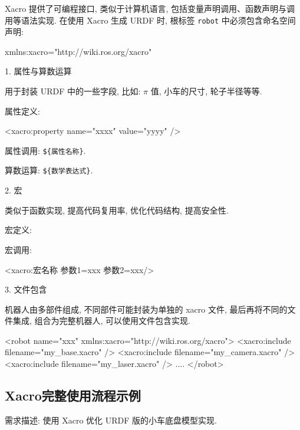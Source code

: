 \documentclass[openany, fontset=windowsold]{ctexbook}
\theoremstyle{kaiti}
\theoremstyle{normal}
\begin{document}
Xacro 提供了可编程接口, 类似于计算机语言, 包括变量声明调用、函数声明与调用等语法实现. 在使用 Xacro 生成 URDF 时, 根标签 \verb|robot| 中必须包含命名空间声明:

\begin{xml}
  xmlns:xacro="http://wiki.ros.org/xacro"
\end{xml}

1. 属性与算数运算

用于封装 URDF 中的一些字段, 比如: $\pi$ 值, 小车的尺寸, 轮子半径等等.

属性定义:

\begin{xml}
  <xacro:property name="xxxx" value="yyyy" />
\end{xml}

属性调用: \verb|${属性名称}|.

算数运算: \verb|${数学表达式}|.

2. 宏

类似于函数实现, 提高代码复用率, 优化代码结构, 提高安全性.

宏定义:


宏调用:

\begin{xml}
  <xacro:宏名称 参数1=xxx 参数2=xxx/>
\end{xml}

3. 文件包含

机器人由多部件组成, 不同部件可能封装为单独的 xacro 文件, 最后再将不同的文件集成, 组合为完整机器人, 可以使用文件包含实现.

\begin{xml}
  <robot name="xxx" xmlns:xacro="http://wiki.ros.org/xacro">
        <xacro:include filename="my_base.xacro" />
        <xacro:include filename="my_camera.xacro" />
        <xacro:include filename="my_laser.xacro" />
        ....
  </robot>
\end{xml}

\subsection{Xacro完整使用流程示例}

需求描述: 使用 Xacro 优化 URDF 版的小车底盘模型实现.
\end{document}
